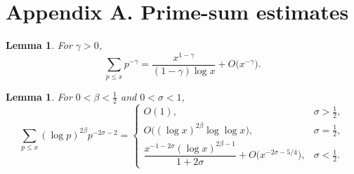 \documentclass[12pt]{article}
\newtheorem{lemma}[theorem]{Lemma}
\theoremstyle{definition}
\theoremstyle{remark}
\begin{document}
\appendix
\section{Appendix A. Prime-sum estimates}

\begin{lemma}
For \(\gamma>0\),
\[
  \sum_{p\le x}p^{-\gamma}=
  \dfrac{x^{1-\gamma}}{(1-\gamma)\log x}+O\!\bigl(x^{-\gamma}\bigr).
\]
\end{lemma}

\begin{lemma}
For \(0<\beta<\tfrac12\) and \(0<\sigma<1\),
\[
  \sum_{p\le x}(\log p)^{2\beta}p^{-2\sigma-2}
   =\begin{cases}
      O(1), & \sigma>\tfrac12,\\[4pt]
      O\bigl((\log x)^{2\beta}\log\log x\bigr), & \sigma=\tfrac12,\\[6pt]
      \dfrac{x^{-1-2\sigma}(\log x)^{2\beta-1}}{1+2\sigma}
        +O\!\bigl(x^{-2\sigma-5/4}\bigr), & \sigma<\tfrac12.
     \end{cases}
\]
\end{lemma}
\end{document}
